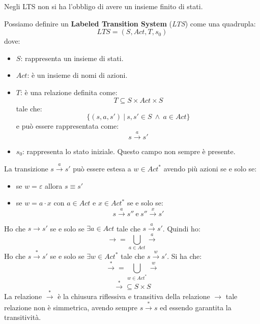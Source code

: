 Negli LTS non si ha l'obbligo di avere un insieme finito di stati.
\begin{definizione}
    Possiamo definire un \textbf{Labeled Transition System} (\textit{LTS}) come
    una quadrupla:
    \begin{equation}
        LTS = (S, Act, T, s_0)
    \end{equation}
    dove:
    \begin{itemize}
        \item \textbf{$S$}: rappresenta un insieme di stati.
        \item \textbf{$Act$}: è un insieme di nomi di azioni.
        \item \textbf{$T$}: è una relazione definita come: $$T \subseteq S \times Act \times S$$
              tale che: $$\{(s, a, s') \ | \ s, s' \in S \ \land \ a \in Act \}$$ e può
              essere rappresentata come: $$s \xrightarrow{a} s'$$
        \item \textbf{$s_0$}: rappresenta lo stato iniziale. Questo campo non
              sempre è presente.
    \end{itemize}
\end{definizione}
La transizione $s \xrightarrow{a} s'$ può essere estesa a $w \in Act^{\ast}$
avendo più azioni se e solo se:
\begin{itemize}
    \item se $w = \varepsilon$ allora $s \equiv s'$
    \item se $w = a \cdot x$ con $a \in Act$ e $x \in Act^{\ast}$ se e solo se:
          \begin{equation}
              s \xrightarrow{a} s'' \ \text{e} \ s'' \xrightarrow{x} s'
          \end{equation}
\end{itemize}
Ho che $s \rightarrow s'$ se e solo se $\exists a \in Act$  tale che
$s \xrightarrow{a} s'$. Quindi ho:
\begin{equation}
    \rightarrow = \bigcup_{a \in Act} \xrightarrow{a}
\end{equation}
Ho che $s \xrightarrow{\ast} s'$ se e solo se $\exists w \in Act^{\ast}$ tale
che $s \xrightarrow{w} s'$. Si ha che:
\begin{equation}
    \xrightarrow{\ast} = \bigcup_{w \in Act^{\ast}} \xrightarrow{w}
\end{equation}
\begin{equation}
    \xrightarrow{\ast}  \subseteq S \times S
\end{equation}
La relazione $\xrightarrow{\ast}$ è la chiusura riflessiva e transitiva della
relazione $\rightarrow$ tale relazione non è simmetrica, avendo sempre
$s \xrightarrow{\ast} s$ ed essendo garantita la transitività.
